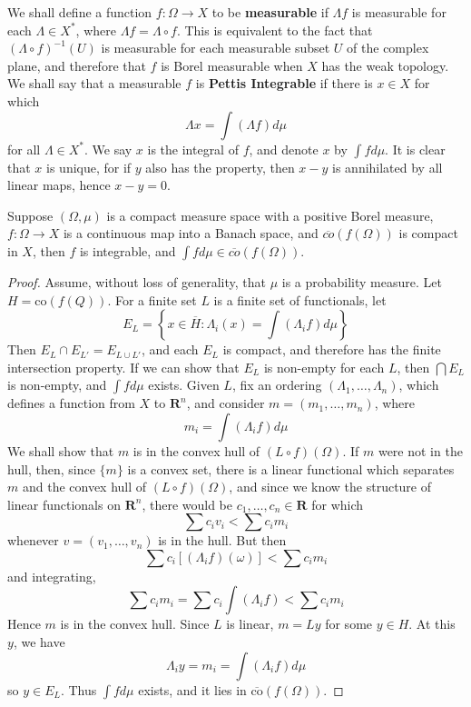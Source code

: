 We shall define a function $f: \Omega \to X$ to be {\bf measurable} if $\Lambda f$ is measurable for each $\Lambda \in X^*$, where $\Lambda f = \Lambda \circ f$. This is equivalent to the fact that $(\Lambda \circ f)^{-1}(U)$ is measurable for each measurable subset $U$ of the complex plane, and therefore that $f$ is Borel measurable when $X$ has the weak topology. We shall say that a measurable $f$ is {\bf Pettis Integrable} if there is $x \in X$ for which
%
\[ \Lambda x = \int (\Lambda f) d\mu \]
%
for all $\Lambda \in X^*$. We say $x$ is the integral of $f$, and denote $x$ by $\int f d\mu$. It is clear that $x$ is unique, for if $y$ also has the property, then $x - y$ is annihilated by all linear maps, hence $x - y = 0$.

\begin{theorem}
    Suppose $(\Omega, \mu)$ is a compact measure space with a positive Borel measure, $f: \Omega \to X$ is a continuous map into a Banach space, and $\overline{co}(f(\Omega))$ is compact in $X$, then $f$ is integrable, and $\int f d\mu \in \overline{co}(f(\Omega))$.
\end{theorem}
\begin{proof}
    Assume, without loss of generality, that $\mu$ is a probability measure. Let $H = \text{co}(f(Q))$. For a finite set $L$ is a finite set of functionals, let
    \[ E_L = \left\{ x \in \overline{H} : \Lambda_i(x) = \int (\Lambda_i f) d\mu \right\} \]
    Then $E_L \cap E_{L'} = E_{L \cup L'}$, and each $E_L$ is compact, and therefore has the finite intersection property. If we can show that $E_L$ is non-empty for each $L$, then $\bigcap E_L$ is non-empty, and $\int f d\mu$ exists. Given $L$, fix an ordering $(\Lambda_1, \dots, \Lambda_n)$, which defines a function from $X$ to $\mathbf{R}^n$, and consider $m = (m_1, \dots, m_n)$, where
    \[ m_i = \int (\Lambda_i f) d\mu \]
    We shall show that $m$ is in the convex hull of $(L \circ f)(\Omega)$. If $m$ were not in the hull, then, since $\{ m \}$ is a convex set, there is a linear functional which separates $m$ and the convex hull of $(L \circ f)(\Omega)$, and since we know the structure of linear functionals on $\mathbf{R}^n$, there would be $c_1, \dots, c_n \in \mathbf{R}$ for which
    \[ \sum c_i v_i < \sum c_i m_i \]
    whenever $v = (v_1, \dots, v_n)$ is in the hull. But then
    \[ \sum c_i [(\Lambda_if) (\omega)] < \sum c_i m_i \]
    and integrating,
    \[ \sum c_i m_i = \sum c_i \int (\Lambda_i f) < \sum c_i m_i \]
    Hence $m$ is in the convex hull. Since $L$ is linear, $m = Ly$ for some $y \in H$. At this $y$, we have
    \[ \Lambda_i y = m_i = \int (\Lambda_i f) d\mu \]
    so $y \in E_L$. Thus $\int f d\mu$ exists, and it lies in $\overline{\text{co}}(f(\Omega))$.
\end{proof}

